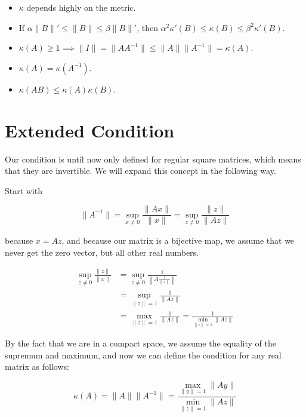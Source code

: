 \begin{itemize}
   
    \item \(\kappa\) depends highly on the metric. 
    
    \item If \(\alpha \|B\|' \le \|B\| \le \beta \|B\|'\), then \(\alpha^2 \kappa '(B) \le \kappa(B) \le \beta^2\kappa '(B)\).
    
    \item \(\kappa(A) \ge 1 \implies \|I\| = \|A A^{-1}\| \le \|A\| \|A^{-1}\| = \kappa(A)\).

    \item \(\kappa(A) = \kappa(A^{-1})\). 

    \item \(\kappa(AB) \le \kappa(A)\kappa(B)\).

\end{itemize}

\section{Extended Condition}

Our condition is until now only defined for regular square matrices, which means that they are invertible.
We will expand this concept in the following way.

Start with  

\[
    \|A^{-1}\| = \sup_{x \ne 0} \frac{\|Ax\|}{\|x\|} = \sup_{z \ne 0} \frac{\|z\|}{\|Az\|}
\]

because \(x = Az\), and because our matrix is a bijective map, we assume that we never get the zero vector, but all other real numbers.

\begin{align*} 
    \sup_{z \ne 0} \frac{\|z\|}{\|x\|} &= \sup_{z \ne 0} \frac{1}{\left\|A \frac{z}{\|z\|}\right\|} \\ 
                                       &= \sup_{\|z\| = 1} \frac{1}{\|Az\|} \\ 
                                       &= \max_{\|z\| = 1} \frac{1}{\|Az\|} = \frac{1}{\min_{\|z\| = 1} \|Az\|}
\end{align*}

By the fact that we are in a compact space, we assume the equality of the supremum and maximum, and now we can define the 
condition for any real matrix as follows: 

\[
    \kappa(A) = \|A\|\|A^{-1}\| = \frac{\max_{\|y\| = 1} \|Ay\|}{\min_{\|z\| = 1}\|Az\|}
\]

